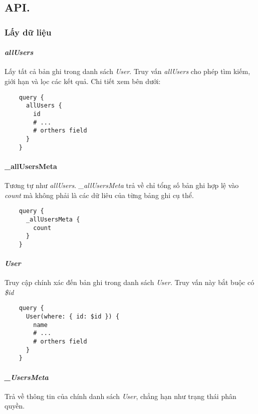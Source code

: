 
\subsection{API.}

\subsubsection{Lấy dữ liệu}

\paragraph{\emph{allUsers}}

Lấy tất cả bản ghi trong danh sách \emph{User}. Truy vấn \emph{allUsers} cho phép tìm kiếm, giới hạn và lọc các kết quả. Chi tiết xem bên dưới:

\begin{lstlisting}
	query {
	  allUsers {
	    id
	    # ...
	    # orthers field
	  }
	}
\end{lstlisting}

\paragraph{\_allUsersMeta}

Tương tự như \emph{allUsers}. \emph{\_allUsersMeta} trả về chỉ tổng số bản ghi hợp lệ vào \emph{count} mà không phải là các dữ liêu của từng bảng ghi cụ thể.

\begin{lstlisting}
	query {
	  _allUsersMeta {
	    count
	  }
	}
\end{lstlisting}

\paragraph{\emph{User}}

Truy cập chính xác đến bản ghi trong danh sách \emph{User}. Truy vấn này bắt buộc có \emph{\$id}
\begin{lstlisting}
	query {
	  User(where: { id: $id }) {
	    name
	    # ...
	    # orthers field
	  }
	}
\end{lstlisting}

\paragraph{\emph{\_UsersMeta}}

Trả về thông tin của chính danh sách \emph{User}, chẳng hạn như trạng thái phân quyền.

